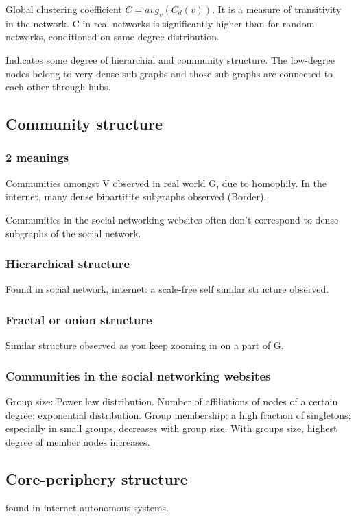 \documentclass[oneside, article]{memoir}
\begin{document}
Global clustering coefficient $C = avg_{v}(C_{d}(v))$. It is a measure of transitivity in the network. C in real networks is significantly higher than for random networks, conditioned on same degree distribution.

Indicates some degree of hierarchial and community structure. The low-degree nodes belong to very dense sub-graphs and those sub-graphs are connected to each other through hubs.

\subsection{Community structure}
\subsubsection{2 meanings}
Communities amongst V observed in real world G, due to homophily. In the internet, many dense bipartitite subgraphs observed (Border).

Communities in the social networking websites often don't correspond to dense subgraphs of the social network.

\subsubsection{Hierarchical structure}
Found in social network, internet: a scale-free self similar structure observed.

\subsubsection{Fractal or onion structure}
Similar structure observed as you keep zooming in on a part of G.

\subsubsection{Communities in the social networking websites}
Group size: Power law distribution. Number of affiliations of nodes of a certain degree: exponential distribution. \cite{zhelevaSocialAffiliationNw} Group membership: a high fraction of singletons: especially in small groups, decreases with group size. With groups size, highest degree of member nodes increases.

\subsection{Core-periphery structure}
found in internet autonomous systems.
\end{document}
